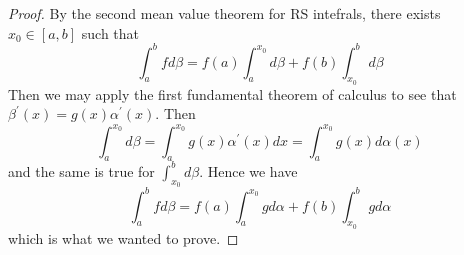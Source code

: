 \documentclass[11pt,largemargins]{homework}
\begin{document}
\question 
\begin{proof} 
	By the second mean value theorem for RS intefrals, there exists $x_0 \in [a, b] $ such that 
	\begin{equation} \int_a^b f d\beta = f(a) \int_a^{x_0} d\beta + f(b)\int_{x_0}^b d \beta \end{equation}
	Then we may apply the first fundamental theorem of calculus to see that $\beta^\prime(x) = g(x)\alpha^\prime(x)$. 
	Then 
	\[ \int_a^{x_0} d\beta = \int_a^{x_0} g(x) \alpha^\prime(x) dx = \int_a^{x_0} g(x) d\alpha(x) \] 
	and the same is true for $\int_{x_0}^bd\beta$. Hence we have 
	\[ \int_a^b fd\beta = f(a)\int_a^{x_0} gd\alpha + f(b) \int_{x_0}^b g d\alpha \] 
	which is what we wanted to prove. 
\end{proof}
\end{document}
